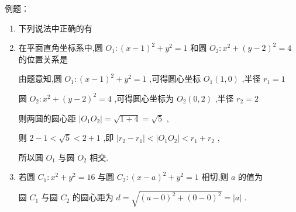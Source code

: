 例题：
\begin{enumerate}
    \item 下列说法中正确的有
    \item 在平面直角坐标系中,圆 ${O}_{1} : {\left( x - 1\right) }^{2} + {y}^{2} = 1$ 和圆 ${O}_{2} : {x}^{2} + {\left( y - 2\right) }^{2} = 4$ 的位置关系是
    \begin{jieda}
        由题意知,圆 ${O}_{1} : {\left( x - 1\right) }^{2} + {y}^{2} = 1$ ,可得圆心坐标 ${O}_{1}\left( {1,0}\right)$ ,半径 ${r}_{1} = 1$
        
        圆 ${O}_{2} : {x}^{2} + {\left( y - 2\right) }^{2} = 4$ ,可得圆心坐标为 ${O}_{2}\left( {0,2}\right)$ ,半径 ${r}_{2} = 2$
        
        则两圆的圆心距 $\left| {{O}_{1}{O}_{2}}\right|  = \sqrt{1 + 4} = \sqrt{5}$ ,
        
        则 $2 - 1 < \sqrt{5} < 2 + 1$ ,即 $\left| {{r}_{2} - {r}_{1}}\right|  < \left| {{O}_{1}{O}_{2}}\right|  < {r}_{1} + {r}_{2}$ ,
        
        所以圆 ${O}_{1}$ 与圆 ${O}_{2}$ 相交.
    \end{jieda}
    
    \item 若圆 ${C}_{1} : {x}^{2} + {y}^{2} = {16}$ 与圆 ${C}_{2} : {\left( x - a\right) }^{2} + {y}^{2} = 1$ 相切,则 $a$ 的值为
    \begin{jieda}
        圆 ${C}_{1}$ 与圆 ${C}_{2}$ 的圆心距为 $d = \sqrt{{\left( a - 0\right) }^{2} + {\left( 0 - 0\right) }^{2}} = \left| a\right|$ . 
    \end{jieda}
    

\end{enumerate}
